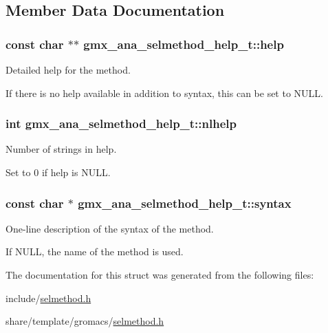 \subsection{\-Member \-Data \-Documentation}
\hypertarget{structgmx__ana__selmethod__help__t_a8298b122a3bd91a8ca635a363f2a8562}{
\subsubsection[{help}]{\setlength{\rightskip}{0pt plus 5cm}const char $\ast$$\ast$ {\bf gmx\-\_\-ana\-\_\-selmethod\-\_\-help\-\_\-t\-::help}}}\label{structgmx__ana__selmethod__help__t_a8298b122a3bd91a8ca635a363f2a8562}


\-Detailed help for the method. 

\-If there is no help available in addition to {\ttfamily syntax}, this can be set to \-N\-U\-L\-L. \hypertarget{structgmx__ana__selmethod__help__t_a6c9953d18124d498c25625b5bbe93ca2}{
\subsubsection[{nlhelp}]{\setlength{\rightskip}{0pt plus 5cm}int {\bf gmx\-\_\-ana\-\_\-selmethod\-\_\-help\-\_\-t\-::nlhelp}}}\label{structgmx__ana__selmethod__help__t_a6c9953d18124d498c25625b5bbe93ca2}


\-Number of strings in {\ttfamily help}. 

\-Set to 0 if {\ttfamily help} is \-N\-U\-L\-L. \hypertarget{structgmx__ana__selmethod__help__t_ab1bf90801f829a203379df9368b20265}{
\subsubsection[{syntax}]{\setlength{\rightskip}{0pt plus 5cm}const char $\ast$ {\bf gmx\-\_\-ana\-\_\-selmethod\-\_\-help\-\_\-t\-::syntax}}}\label{structgmx__ana__selmethod__help__t_ab1bf90801f829a203379df9368b20265}


\-One-\/line description of the syntax of the method. 

\-If \-N\-U\-L\-L, the name of the method is used. 

\-The documentation for this struct was generated from the following files\-:\begin{DoxyCompactItemize}
\item 
include/\hyperlink{include_2selmethod_8h}{selmethod.\-h}\item 
share/template/gromacs/\hyperlink{share_2template_2gromacs_2selmethod_8h}{selmethod.\-h}\end{DoxyCompactItemize}
